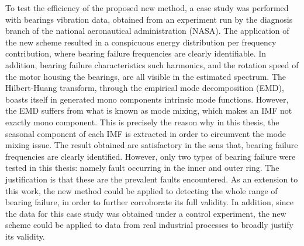 \documentclass[../Main/thesis.tex]{subfiles}
\begin{document}
	\justify
	To test the efficiency of the proposed new method, a case study was performed with bearings vibration data, obtained from an experiment run by the diagnosis branch of the national aeronautical administration (NASA). The application of the new scheme resulted in a conspicuous energy distribution per frequency contribution, where bearing failure frequencies are clearly identifiable. In addition, bearing failure characteristics such harmonics, and the rotation speed of the motor housing the bearings, are all visible in the estimated spectrum.
	\justify
	The Hilbert-Huang transform, through the empirical mode decomposition (EMD), boasts itself in generated mono components intrinsic mode functions. However, the EMD suffers from what is known as mode mixing, which makes an IMF not exactly mono component. This is precisely the reason why in this thesis, the seasonal component of each IMF is extracted in order to circumvent the mode mixing issue.
	\justify
	The result obtained are satisfactory in the sens that, bearing failure frequencies are clearly identified. However, only two types of bearing failure were tested in this thesis: namely fault occurring in the inner and outer ring. The justification is that these are the prevalent faults encountered. As an extension to this work, the new method could be applied to detecting the whole range of bearing failure, in order to further corroborate its full validity. In addition, since the data for this case study was obtained under a control experiment, the new scheme could be applied to data from real industrial processes to broadly justify its validity.

	
\end{document}
